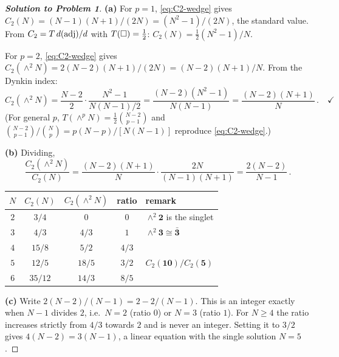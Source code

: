 \documentclass[11pt,a4paper]{article}
\begin{document}
\begin{proof}[\textbf{Solution to Problem 1}]

\textbf{(a)} For $p = 1$, \eqref{eq:C2-wedge} gives
$C_2(N) = (N-1)(N+1)/(2N) = (N^2-1)/(2N)$, the standard value.  From
$C_2 = T\,d(\mathrm{adj})/d$ with $T(\square) = \tfrac12$:
$C_2(N) = \tfrac12 (N^2-1)/N$.  \checkmark

For $p = 2$, \eqref{eq:C2-wedge} gives
$C_2(\wedge^2 N) = 2(N-2)(N+1)/(2N) = (N-2)(N+1)/N$.  From the
Dynkin index:
\begin{equation*}
  C_2(\wedge^2 N) = \frac{N-2}{2}\cdot\frac{N^2-1}{N(N-1)/2}
  = \frac{(N-2)(N^2-1)}{N(N-1)} = \frac{(N-2)(N+1)}{N}\,.
  \quad\checkmark
\end{equation*}
(For general $p$, $T(\wedge^p N) = \tfrac12\binom{N-2}{p-1}$ and
$\binom{N-2}{p-1}/\binom{N}{p} = p(N-p)/[N(N-1)]$ reproduce
\eqref{eq:C2-wedge}.)

\medskip

\textbf{(b)} Dividing,
\begin{equation*}
  \frac{C_2(\wedge^2 N)}{C_2(N)}
  = \frac{(N-2)(N+1)}{N}\cdot\frac{2N}{(N-1)(N+1)}
  = \frac{2(N-2)}{N-1}\,.
\end{equation*}
\begin{center}
\renewcommand{\arraystretch}{1.3}
\begin{tabular}{c c c c l}
\toprule
$N$ & $C_2(N)$ & $C_2(\wedge^2 N)$ & ratio & remark \\
\midrule
$2$ & $3/4$ & $0$ & $0$ & $\wedge^2\mathbf{2}$ is the singlet \\
$3$ & $4/3$ & $4/3$ & $1$ & $\wedge^2\mathbf{3} \cong \bar{\mathbf{3}}$ \\
$4$ & $15/8$ & $5/2$ & $4/3$ & \\
$5$ & $12/5$ & $18/5$ & $3/2$ & $C_2(\mathbf{10})/C_2(\mathbf{5})$ \\
$6$ & $35/12$ & $14/3$ & $8/5$ & \\
\bottomrule
\end{tabular}
\end{center}

\medskip

\textbf{(c)} Write $2(N-2)/(N-1) = 2 - 2/(N-1)$.  This is an integer
exactly when $N-1$ divides $2$, i.e.\ $N = 2$ (ratio $0$) or $N = 3$
(ratio $1$).  For $N \geq 4$ the ratio increases strictly from $4/3$
towards $2$ and is never an integer.  Setting it to $3/2$ gives
$4(N-2) = 3(N-1)$, a linear equation with the single solution
$N = 5$.

\end{proof}
\end{document}
